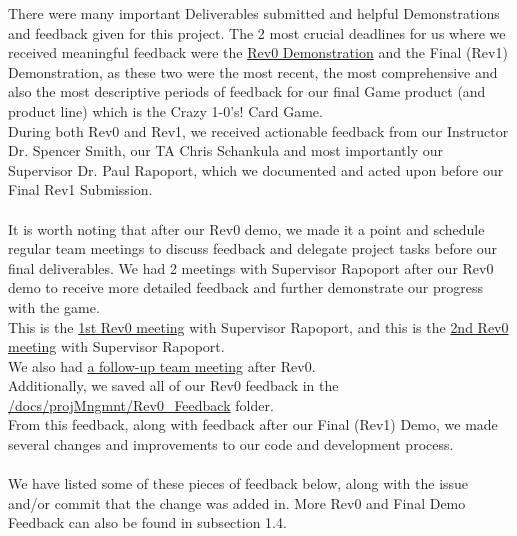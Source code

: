 \documentclass{article}
\begin{document}
There were many important Deliverables submitted and helpful Demonstrations
and feedback given for this project. The 2 most crucial deadlines
for us where we received meaningful feedback were the 
\href{https://github.com/The-Crazy-Four-Games/Crazy_1-0s_Game/issues/256}{Rev0 Demonstration}
and the 
Final (Rev1) Demonstration, 
as these two were the most recent, the
most comprehensive and also the most descriptive periods of feedback
for our final Game product (and product line) which is the 
Crazy 1-0's! Card Game.\\
During both Rev0 and Rev1, we received actionable feedback
from our Instructor Dr. Spencer Smith, our TA Chris Schankula and most 
importantly our Supervisor Dr. Paul Rapoport, which we documented 
and acted upon before our Final Rev1 Submission.\\\\
It is worth noting that after our Rev0 demo, we made it a point
and schedule regular team meetings to discuss feedback and delegate 
project tasks before our final deliverables. 
We had 2 meetings with Supervisor Rapoport after our Rev0 demo to receive
more detailed feedback and further demonstrate our progress with the game.\\
This is the \href{https://github.com/The-Crazy-Four-Games/Crazy_1-0s_Game/issues/257}{1st Rev0 meeting} 
with Supervisor Rapoport, and this is the 
\href{https://github.com/The-Crazy-Four-Games/Crazy_1-0s_Game/issues/263}{2nd Rev0 meeting} 
with Supervisor Rapoport.\\ We also had 
\href{https://github.com/The-Crazy-Four-Games/Crazy_1-0s_Game/issues/262}{a follow-up team meeting}
 after Rev0.\\


Additionally, we saved all of our Rev0 feedback in the \\
\href{https://github.com/The-Crazy-Four-Games/Crazy_1-0s_Game/docs/projMngmnt/Rev0_Feedback}{/docs/projMngmnt/Rev0\_Feedback}
folder.\\
From this feedback, along with feedback after our Final (Rev1) Demo,
we made several changes and improvements to our code and development process.\\\\
We have listed some of these pieces of feedback below, 
along with the issue and/or commit that the change was added in.
More Rev0 and Final Demo Feedback can also be found in subsection 1.4.
\end{document}
